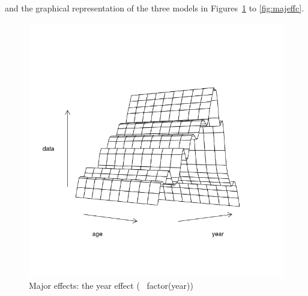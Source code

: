\documentclass[a4paper,english,11pt]{article}
\begin{document}
and the graphical representation of the three models in Figures~\ref{fig:majeffy} to \ref{fig:majeffc}.

\begin{knitrout}
\color{fgcolor}\begin{kframe}
\begin{alltt}
\hldef{(}  \hldef{=} \hldef{)}
\end{alltt}
\end{kframe}\begin{figure}[H]

{\centering \includegraphics[width=.9\linewidth]{figure/majeffy-1} 

}

\caption[Major effects]{Major effects: the year effect (~ factor(year))}\label{fig:majeffy}
\end{figure}

\end{knitrout}
\end{document}
